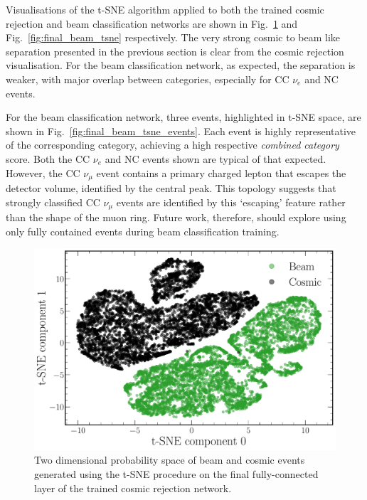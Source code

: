 Visualisations of the t-SNE algorithm applied to both the trained cosmic rejection and beam
classification networks are shown in Fig.~\ref{fig:final_cosmic_tsne} and
Fig.~\ref{fig:final_beam_tsne} respectively. The very strong cosmic to beam like separation
presented in the previous section is clear from the cosmic rejection visualisation. For the beam
classification network, as expected, the separation is weaker, with major overlap between
categories, especially for CC $\nu_{e}$ and NC events.

For the beam classification network, three events, highlighted in t-SNE space, are shown in
Fig.~\ref{fig:final_beam_tsne_events}. Each event is highly representative of the corresponding
category, achieving a high respective \emph{combined category} score. Both the CC $\nu_{e}$ and NC
events shown are typical of that expected. However, the CC $\nu_{\mu}$ event contains a primary
charged lepton that escapes the detector volume, identified by the central peak. This topology
suggests that strongly classified CC $\nu_{\mu}$ events are identified by this `escaping' feature
rather than the shape of the muon ring. Future work, therefore, should explore using only fully
contained events during beam classification training.

\begin{figure} %
    \includegraphics[width=\textwidth]{diagrams/7-results/final_cosmic_tsne.pdf}
    \caption[Cosmic rejection network t-SNE space]
    {Two dimensional probability space of beam and cosmic events generated using the t-SNE
        procedure on the final fully-connected layer of the trained cosmic rejection network.}
    \label{fig:final_cosmic_tsne}
\end{figure}

